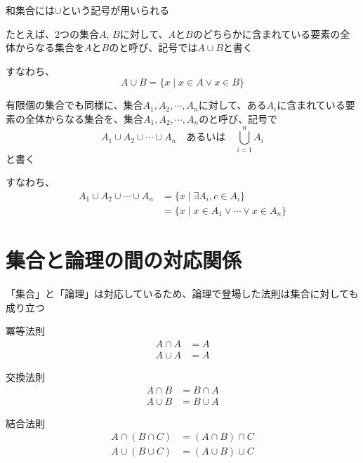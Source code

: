 \documentclass[b5paper,12pt]{jsarticle}
\begin{document}
和集合には$\cup$という記号が用いられる

\sectionline

たとえば、2つの集合$A,\,B$に対して、$A$と$B$のどちらかに含まれている要素の全体からなる集合を$A$と$B$のと呼び、記号では$A \cup B$と書く

\br

すなわち、
\begin{equation*}
  A \cup B = \{x \mid x \in A \lor x \in B\}
\end{equation*}

\sectionline

有限個の集合でも同様に、集合$A_1, A_2, \cdots , A_n$に対して、ある$A_i$に含まれている要素の全体からなる集合を、集合$A_1, A_2, \cdots , A_n$のと呼び、記号で
\begin{equation*}
  A_1 \cup A_2 \cup \cdots \cup A_n \quad \text{あるいは} \quad \bigcup_{i=1}^n A_i
\end{equation*}
と書く

\br

すなわち、
\begin{align*}
  A_1 \cup A_2 \cup \cdots \cup A_n
   & = \{x \mid \exists A_i , c \in A_i \}             \\
   & = \{x \mid x \in A_1 \lor \cdots \lor x \in A_n\}
\end{align*}

\sectionline
\section{集合と論理の間の対応関係}

「集合」と「論理」は対応しているため、論理で登場した法則は集合に対しても成り立つ

\begin{theorem}{冪等法則}
  \begin{align*}
    A \cap A & = A \\
    A \cup A & = A
  \end{align*}
\end{theorem}

\begin{theorem}{交換法則}
  \begin{align*}
    A \cap B & = B \cap A \\
    A \cup B & = B \cup A
  \end{align*}
\end{theorem}

\begin{theorem}{結合法則}
  \begin{align*}
    A \cap (B \cap C) & = (A \cap B) \cap C \\
    A \cup (B \cup C) & = (A \cup B) \cup C
  \end{align*}
\end{theorem}
\end{document}
